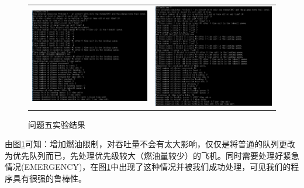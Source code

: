 \documentclass[12pt,UTF8]{ctexart}
\begin{document}
\begin{spacing}{1.4}
\begin{figure}[H]
	\centering
	\begin{tabular}{cc}
	\includegraphics[width=0.5\linewidth]{fig/exp_50.PNG} &
	\includegraphics[width=0.5\linewidth]{fig/exp_51.PNG}
	\end{tabular}
	\caption{问题五实验结果}
	\label{fig:5}
\end{figure}
由图\ref{fig:5}可知：增加燃油限制，对吞吐量不会有太大影响，仅仅是将普通的队列更改为优先队列而已，先处理优先级较大（燃油量较少）的飞机。同时需要处理好紧急情况(EMERGENCY)，在图\ref{fig:5}中出现了这种情况并被我们成功处理，可见我们的程序具有很强的鲁棒性。


\end{spacing}
\end{document}
